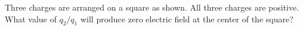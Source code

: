 Three charges are arranged on a square as shown. All
        three charges are positive. What value of $q_2/q_1$ will
        produce zero electric field at the center of the square?\answercheck
